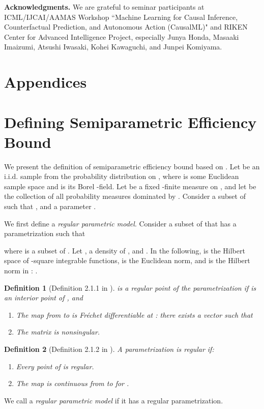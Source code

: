 \documentclass[letterpaper]{article} \usepackage{aaai19}  \usepackage{times}  \usepackage{helvet}  \usepackage{courier}  \usepackage{url}  \usepackage{graphicx}  \frenchspacing  \usepackage{comment}
\newtheorem{definition}{Definition}
\newcommand{\citet}[1]
{\citeauthor{#1} \shortcite{#1}}
\begin{document}
\noindent \textbf{Acknowledgments.} 
We are grateful to seminar participants at ICML/IJCAI/AAMAS Workshop ``Machine Learning for Causal Inference, Counterfactual Prediction, and Autonomous Action (CausalML)" and RIKEN Center for Advanced Intelligence Project, especially Junya Honda, Masaaki Imaizumi, Atsushi Iwasaki, Kohei Kawaguchi, and Junpei Komiyama. 






\appendix

\section*{Appendices}

\section{Defining Semiparametric Efficiency Bound}\label{SEB}
We present the definition of semiparametric efficiency bound based on \citet{Bickel1993}.
Let  be an i.i.d. sample from the probability distribution  on , where  is some Euclidean sample space and  is its Borel -field.
Let  be a fixed -finite measure on , and let  be the collection of all probability measures dominated by .
Consider a subset  of  such that , and a parameter .

We first define a {\it regular parametric model}.
Consider a subset  of  that has a parametrization  such that

where  is a subset of .
Let , a density of , and .
In the following,  is the Hilbert space of -square integrable functions,  is the Euclidean norm, and  is the Hilbert norm in : .

\begin{definition}[Definition 2.1.1 in \citet{Bickel1993}]
	 is a {\it regular point} of the parametrization  if  is an interior point of , and
	\renewcommand\labelenumi{(\roman{enumi})}
	\begin{enumerate}
		\setlength{\itemindent}{10pt}
		\item The map  from  to  is Fr\'echet differentiable at : there exists a vector  such that
		
		\item The  matrix  is nonsingular.
	\end{enumerate}
\end{definition}

\begin{definition}[Definition 2.1.2 in \citet{Bickel1993}]
	A parametrization  is {\it regular} if:
	\renewcommand\labelenumi{(\roman{enumi})}
	\begin{enumerate}
		\setlength{\itemindent}{10pt}
		\item Every point of  is regular.
		\item The map  is continuous from  to  for .
	\end{enumerate}
\end{definition}
\noindent
We call  a {\it regular parametric model} if it has a regular parametrization.
\end{document}
